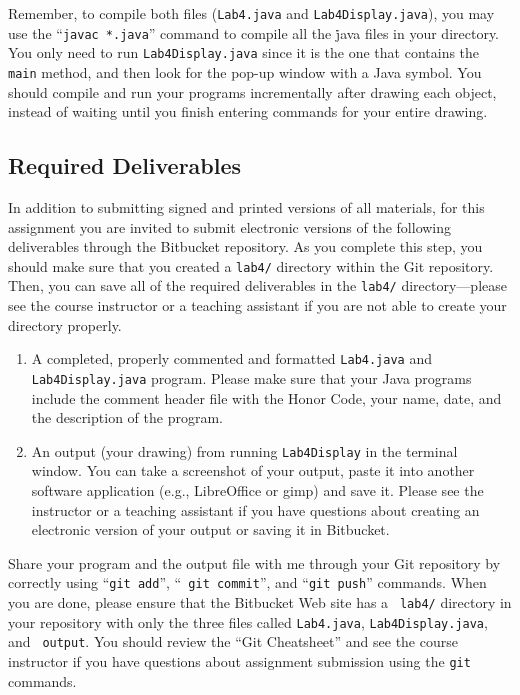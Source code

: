 \begin{sloppypar}
Remember, to compile both files ({\tt Lab4.java} and {\tt Lab4Display.java}), you may use the ``{\tt javac *.java}''
command to compile all the {\.java} files in your directory. You only need to run {\tt Lab4Display.java} since it is the
one that contains the {\tt main} method, and then look for the pop-up window with a Java symbol. You should compile and run
your programs incrementally after drawing each object, instead of waiting until you finish entering commands for your
entire drawing.
\end{sloppypar}

\vspace*{-.1in}
\subsection*{Required Deliverables}

In addition to submitting signed and printed versions of all materials, for this assignment you are invited to submit
electronic versions of the following deliverables through the Bitbucket repository. As you complete this step, you
should make sure that you created a {\tt lab4/} directory within the Git repository.  Then, you can save all of the
required deliverables in the {\tt lab4/} directory---please see the course instructor or a teaching assistant if you are
not able to create your directory properly.

\begin{enumerate}

        \item A completed, properly commented and formatted {\tt Lab4.java} and {\tt Lab4Display.java} program. Please
          make sure that your Java programs include the comment header file with the Honor Code, your name, date, and
          the description of the program.

        \item An output (your drawing) from running {\tt Lab4Display} in the terminal window. You can take a screenshot
          of your output, paste it into another software application (e.g., LibreOffice or gimp) and save it. Please see
          the instructor or a teaching assistant if you have questions about creating an electronic version of your
          output or saving it in Bitbucket.

\end{enumerate}

\vspace{-0.1in}

Share your program and the output file with me through your Git repository by correctly using ``{\tt git add}'', ``{\tt
git commit}'', and ``{\tt git push}'' commands. When you are done, please ensure that the Bitbucket Web site has a {\tt
lab4/} directory in your repository with only the three files called {\tt Lab4.java}, {\tt Lab4Display.java}, and {\tt
output}. You should review the ``Git Cheatsheet'' and see the course instructor if you have questions about assignment
submission using the {\tt git} commands.


